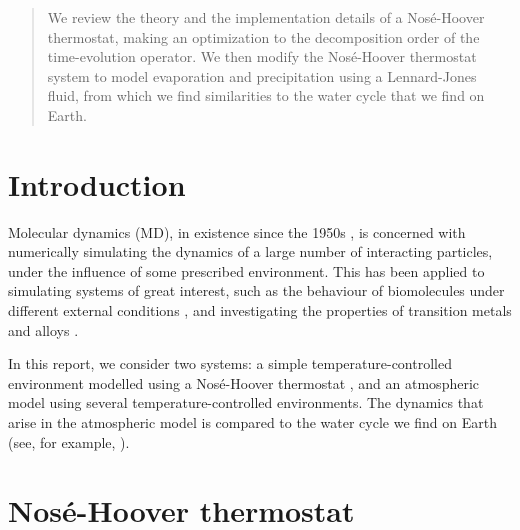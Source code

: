 \documentclass[a4paper,10pt]{article}
\begin{document}
\title{}
\author{\Large \textbf{Thomas Loke} \\
\large 10911381@student.uwa.edu.au \\
\large School of Physics, The University of Western Australia, 35 Stirling Highway, Crawley WA 6009, Perth, Australia \\
\large Malaysia}
\date{}

\maketitle

\begin{abstract}

We review the theory and the implementation details of a Nos\'{e}-Hoover thermostat, making an optimization to the decomposition order of the time-evolution operator. We then modify the Nos\'{e}-Hoover thermostat system to model evaporation and precipitation using a Lennard-Jones fluid, from which we find similarities to the water cycle that we find on Earth.

\end{abstract}

\section{Introduction}
\label{sec:intro}

Molecular dynamics (MD), in existence since the 1950s \cite{Alder1959}, is concerned with numerically simulating the dynamics of a large number of interacting particles, under the influence of some prescribed environment. This has been applied to simulating systems of great interest, such as the behaviour of biomolecules under different external conditions \cite{Okumura2008}, and investigating the properties of transition metals and alloys \cite{Cleri1993}. 

In this report, we consider two systems: a simple temperature-controlled environment modelled using a Nos\'{e}-Hoover thermostat \cite{Nose1984,Hoover1985}, and an atmospheric model using several temperature-controlled environments. The dynamics that arise in the atmospheric model is compared to the water cycle we find on Earth (see, for example, \cite{watercycle}).

\section{Nos\'{e}-Hoover thermostat}
\label{sec:nht}
\end{document}
